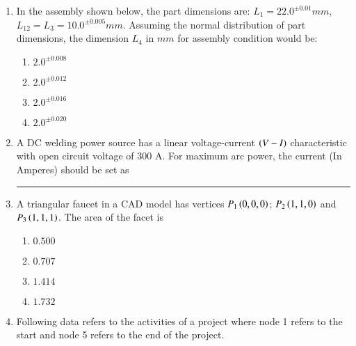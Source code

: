 \documentclass[journal]{IEEEtran}
\begin{document}
\begin{enumerate}
\setcounter{enumi}{0}

    \item In the assembly shown below, the part dimensions are: $L_1=22.0^{\pm0.01}mm$, $L_12=L_3=10.0^{\pm0.005}mm$. Assuming the normal distribution of part dimensions, the dimension $L_4$ in $mm$ for assembly condition would be:

    
    

    \begin{multicols}{4}
        \begin{enumerate}
            \item $2.0^{\pm0.008}$
            \item $2.0^{\pm0.012}$
            \item $2.0^{\pm0.016}$
            \item $2.0^{\pm0.020}$
        \end{enumerate}
    \end{multicols}

    \item A DC welding power source has a linear voltage-current $\left(V-I\right)$ characteristic with open circuit voltage of 300 A. For maximum arc power, the current (In Amperes) should be set as \rule{1cm}{0.15mm}

    \item A triangular faucet in a CAD model has vertices $P_1\left(0,0,0\right)$; $P_2\left(1,1,0\right)$ and $P_3\left(1,1,1\right)$. The area of the facet is

    \begin{multicols}{4}
        \begin{enumerate}
            \item $0.500$
            \item $0.707$
            \item $1.414$
            \item $1.732$
        \end{enumerate}
    \end{multicols}


    \item Following data refers to the activities of a project where node 1 refers to the start and node 5 refers to the end of the project.

    \begin{table}[h]
        \centering
        
        \label{tab:43}
    \end{table}


\end{enumerate}
\end{document}
